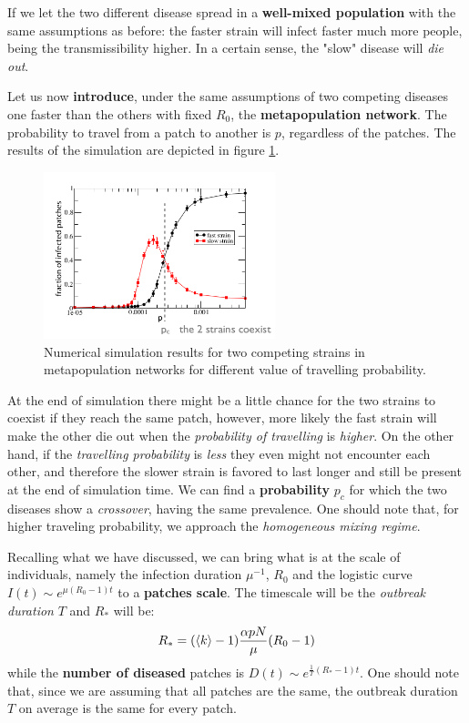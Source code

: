 \documentclass[../main/main.tex]{subfiles}
\begin{document}
If we let the two different disease spread in a \textbf{well-mixed population} with the same assumptions as before: the faster strain will infect faster much more people, being the transmissibility higher. In a certain sense, the "slow" disease will \textit{die out}.

Let us now \textbf{introduce}, under the same assumptions of two competing diseases one faster than the others with fixed $R_0$, the \textbf{metapopulation network}. The probability to travel from a patch to another is $p$, regardless of the patches. The results of the simulation are depicted in figure \ref{fig:16_09}.

\begin{figure}[h!]
\centering
\includegraphics[width=0.6\textwidth]{../lessons/image/16/image09.png}
\caption{\label{fig:16_09} Numerical simulation results for two competing strains in metapopulation networks for different value of travelling probability.}
\end{figure}

At the end of simulation there might be a little chance for the two strains to coexist if they reach the same patch, however, more likely the fast strain will make the other die out when the \textit{probability of travelling} is \textit{higher}. On the other hand, if the \textit{travelling probability} is \textit{less} they even might not encounter each other, and therefore the slower strain is favored to last longer and still be present at the end of simulation time. We can find a \textbf{probability} $p_c$ for which the two diseases show a \textit{crossover}, having the same prevalence. One should note that, for higher traveling probability, we approach the \textit{homogeneous mixing regime}.

Recalling what we have discussed, we can bring what is at the scale of individuals, namely the infection duration $\mu^{-1}$, $R_0$ and the logistic curve $I(t) \sim e^{\mu(R_0-1)t}$ to a \textbf{patches scale}. The timescale will be the \textit{outbreak duration} $T$ and $R_*$ will be:
\begin{equation}
R_* = (\expval{k}-1) \frac{\alpha p N}{\mu} (R_0 - 1)
\end{equation}
while the \textbf{number of diseased} patches is $D(t) \sim e^{\frac{1}{T}(R_* - 1) t}$. One should note that, since we are assuming that all patches are the same, the outbreak duration $T$ on average is the same for every patch.
\end{document}
